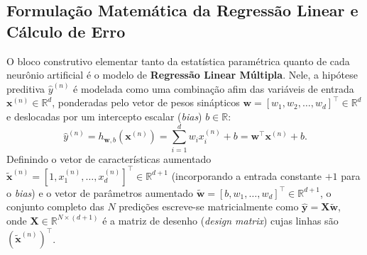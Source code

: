﻿\documentclass[runningheads]{llncs}
\begin{document}
\subsection{Formula\c{c}\~{a}o Matem\'{a}tica da Regress\~{a}o Linear e C\'{a}lculo de Erro}
O bloco construtivo elementar tanto da estat\'{i}stica param\'{e}trica quanto de cada neur\^{o}nio artificial \'{e} o modelo de \textbf{Regress\~{a}o Linear M\'{u}ltipla}. Nele, a hip\'{o}tese preditiva $\hat{y}^{(n)}$ \'{e} modelada como uma combina\c{c}\~{a}o afim das vari\'{a}veis de entrada $\mathbf{x}^{(n)} \in \mathbb{R}^d$, ponderadas pelo vetor de pesos sin\'{a}pticos $\mathbf{w} = [w_1, w_2, \dots, w_d]^\top \in \mathbb{R}^d$ e deslocadas por um intercepto escalar (\textit{bias}) $b \in \mathbb{R}$:
\begin{equation}
    \hat{y}^{(n)} = h_{\mathbf{w}, b}(\mathbf{x}^{(n)}) = \sum_{i=1}^{d} w_i x_i^{(n)} + b = \mathbf{w}^\top \mathbf{x}^{(n)} + b.
    \label{eq:linear_reg}
\end{equation}
Definindo o vetor de caracter\'{i}sticas aumentado $\tilde{\mathbf{x}}^{(n)} = [1, x_1^{(n)}, \dots, x_d^{(n)}]^\top \in \mathbb{R}^{d+1}$ (incorporando a entrada constante $+1$ para o \textit{bias}) e o vetor de par\^{a}metros aumentado $\tilde{\mathbf{w}} = [b, w_1, \dots, w_d]^\top \in \mathbb{R}^{d+1}$, o conjunto completo das $N$ predi\c{c}\~{o}es escreve-se matricialmente como $\hat{\mathbf{y}} = \mathbf{X}\tilde{\mathbf{w}}$, onde $\mathbf{X} \in \mathbb{R}^{N \times (d+1)}$ \'{e} a matriz de desenho (\textit{design matrix}) cujas linhas s\~{a}o $(\tilde{\mathbf{x}}^{(n)})^\top$.
\end{document}
